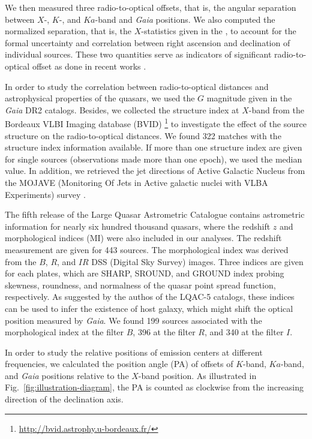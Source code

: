 \documentclass{aa-note}   %
\begin{document}
We then measured three radio-to-optical offsets, that is, the angular separation between $X$-, $K$-, and $Ka$-band and \textit{Gaia} positions.
We also computed the normalized separation, that is, the $X$-statistics given in the \citet{2016A&A...595A...5M}, 
to account for the formal uncertainty and correlation between right ascension and declination of individual sources.
These two quantities serve as indicators of significant radio-to-optical offset as done in recent works \citep[e.g.,][]{2019MNRAS.482.3023P,2018A&A...616A..14G}.

In order to study the correlation between radio-to-optical distances and astrophysical properties of the quasars, we used the $G$ magnitude given in the {\it Gaia} DR2 catalogs.
Besides, we collected the structure index \citep[SI;][]{1997ApJS..111...95F} at $X$-band from the Bordeaux VLBI Imaging database (BVID) \footnote{\url{http://bvid.astrophy.u-bordeaux.fr/}} to investigate the effect of the source structure on the radio-to-optical distances.
We found 322 matches with the structure index information available.
If more than one structure index are given for single sources (observations made more than one epoch), we used the median value.
In addition, we retrieved the jet directions of Active Galactic Nucleus from the MOJAVE (Monitoring Of Jets in Active galactic nuclei with VLBA Experiments) survey \citep[][their Table~4]{2019ApJ...874...43L}.

The fifth release of the Large Quasar Astrometric Catalogue \citep[LQAC-5;][]{2019A&A...624A.145S} contains astrometric information 
for nearly six hundred thousand quasars, where the redshift $z$ and morphological indices (MI) were also included in our analyses.
The redshift measurement are given for 443 sources.
The morphological index was derived from the $B$, $R$,  and $IR$  DSS (Digital Sky Survey) images.
Three indices are given for each plates, which are SHARP, SROUND, and GROUND index probing skewness, roundness, and normalness of the quasar point spread function, respectively. 
As suggested by the authos of the LQAC-5 catalogs, these indices can be used to infer the existence of host galaxy, which might shift the optical position measured by \textit{Gaia}.
We found 199 sources associated with the morphological index at the filter $B$, 396 at the filter $R$, and 340 at the filter $I$.

In order to study the relative positions of emission centers at different frequencies, 
we calculated the position angle (PA) of offsets of $K$-band, $Ka$-band, and \textit{Gaia} positions relative to the $X$-band position.
As illustrated in Fig.~\ref{fig:illustration-diagram}, the PA is counted as clockwise from the increasing direction of the declination axis.
\end{document}
